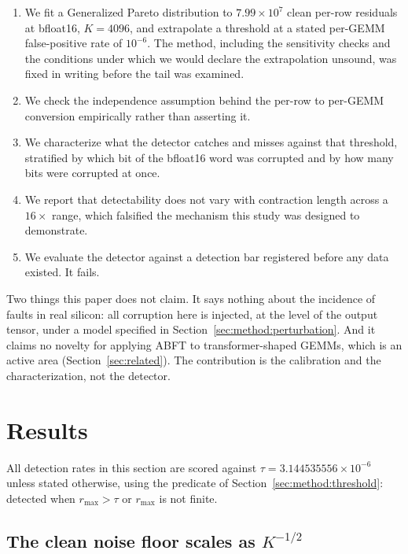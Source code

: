 \documentclass[11pt]{article}
\begin{document}
\begin{enumerate}
\item We fit a Generalized Pareto distribution to $7.99 \times 10^{7}$ clean
per-row residuals at bfloat16, $K = 4096$, and extrapolate a threshold at a
stated per-GEMM false-positive rate of $10^{-6}$. The method, including the
sensitivity checks and the conditions under which we would declare the
extrapolation unsound, was fixed in writing before the tail was examined.
\item We check the independence assumption behind the per-row to per-GEMM
conversion empirically rather than asserting it.
\item We characterize what the detector catches and misses against that
threshold, stratified by which bit of the bfloat16 word was corrupted and by
how many bits were corrupted at once.
\item We report that detectability does not vary with contraction length across
a $16\times$ range, which falsified the mechanism this study was designed to
demonstrate.
\item We evaluate the detector against a detection bar registered before any
data existed. It fails.
\end{enumerate}

Two things this paper does not claim. It says nothing about the incidence of
faults in real silicon: all corruption here is injected, at the level of the
output tensor, under a model specified in Section~\ref{sec:method:perturbation}.
And it claims no novelty for applying ABFT to transformer-shaped GEMMs, which
is an active area (Section~\ref{sec:related}). The contribution is the
calibration and the characterization, not the detector.





\section{Results}
\label{sec:results}

All detection rates in this section are scored against
$\tau = 3.144535556 \times 10^{-6}$ unless stated otherwise, using the
predicate of Section~\ref{sec:method:threshold}: detected when
$r_{\max} > \tau$ or $r_{\max}$ is not finite.

\subsection{The clean noise floor scales as \texorpdfstring{$K^{-1/2}$}{K\^-1/2}}
\label{sec:results:floor}
\end{document}
